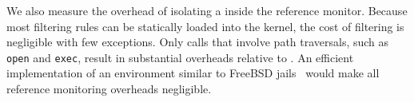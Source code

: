 We also measure the overhead of isolating a \sysname{} \picoproc{} inside the reference monitor.
Because most filtering rules can be statically loaded into the kernel,
the cost of filtering is negligible with few exceptions.
Only calls that
involve path traversals, such as {\tt open} and {\tt exec}, result in substantial overheads relative to \sysname{}.
An efficient implementation of an environment similar to FreeBSD  jails~\citep{jails}
would make all reference monitoring overheads negligible.

